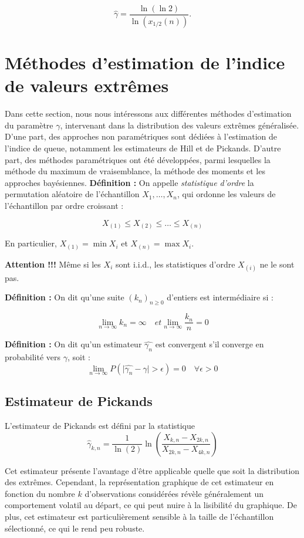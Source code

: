 \documentclass{article}
\begin{document}
\[
\hat{\gamma} = \frac{\ln(\ln 2)}{\ln(x_{1/2}(n))}.
\]

\section{Méthodes d'estimation de l'indice de valeurs extrêmes}
Dans cette section, nous nous intéressons aux différentes méthodes d'estimation du paramètre \(\gamma\), intervenant dans la distribution des valeurs extrêmes généralisée. D'une part, des approches non paramétriques sont dédiées à l'estimation de l'indice de queue, notamment les estimateurs de Hill et de Pickands. D'autre part, des méthodes paramétriques ont été développées, parmi lesquelles la méthode du maximum de vraisemblance, la méthode des moments et les approches bayésiennes.
\newline
\textbf{Définition :} On appelle \textit{statistique d'ordre} la permutation aléatoire de l'échantillon \(X_1, \dots, X_n\), qui ordonne les valeurs de l’échantillon par ordre croissant :

\[
X_{(1)} \leq X_{(2)} \leq \dots \leq X_{(n)}
\]

En particulier, \(X_{(1)} = \min X_i\) et \(X_{(n)} = \max X_i\).

\textbf{Attention !!!} Même si les \(X_i\) sont i.i.d., les statistiques d’ordre \(X_{(i)}\) ne le sont pas.

\textbf{Définition :} On dit qu'une suite \((k_n)_{n \geq 0}\) d'entiers est intermédiaire si :

\[
\lim_{n \to \infty} k_n = \infty \quad et \lim_{n \to \infty} \frac{k_n}{n} = 0
\]

\textbf{Définition :}
On dit qu'un estimateur \(\hat{\gamma_{n}}\) est convergent s'il converge en probabilité vers \(\gamma\), soit :
\[
\lim_{n \to \infty} P(\lvert \hat{\gamma_{n}} - \gamma \rvert > \epsilon) = 0 \quad \forall \epsilon > 0
\]
\subsection{Estimateur de Pickands}

L'estimateur de Pickands est défini par la statistique 
\[
\hat{\gamma}_{k,n} = \frac{1}{\ln(2)} \ln\left(\frac{X_{k,n} - X_{2k,n}}{X_{2k,n} - X_{4k,n}}\right)
\]

Cet estimateur présente l'avantage d'être applicable quelle que soit la distribution des extrêmes. Cependant, la représentation graphique de cet estimateur en fonction du nombre \(k\) d'observations considérées révèle généralement un comportement volatil au départ, ce qui peut nuire à la lisibilité du graphique. De plus, cet estimateur est particulièrement sensible à la taille de l'échantillon sélectionné, ce qui le rend peu robuste.
\end{document}
